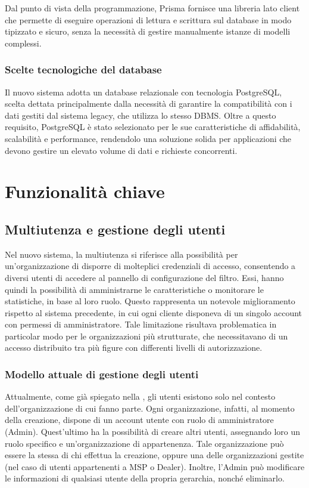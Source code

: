 Dal punto di vista della programmazione, Prisma fornisce una libreria lato client che permette di eseguire operazioni di lettura e scrittura sul database in modo tipizzato e sicuro, senza la necessità di gestire manualmente istanze di modelli complessi.

\subsubsection{Scelte tecnologiche del database}
Il nuovo sistema adotta un database relazionale con tecnologia PostgreSQL, scelta dettata principalmente dalla necessità di garantire la compatibilità con i dati gestiti dal sistema legacy, che utilizza lo stesso DBMS. Oltre a questo requisito, PostgreSQL è stato selezionato per le sue caratteristiche di affidabilità, scalabilità e performance, rendendolo una soluzione solida per applicazioni che devono gestire un elevato volume di dati e richieste concorrenti.

\section{Funzionalità chiave}
\subsection{Multiutenza e gestione degli utenti}
Nel nuovo sistema, la multiutenza si riferisce alla possibilità per un'organizzazione di disporre di molteplici credenziali di accesso, consentendo a diversi utenti di accedere al pannello di configurazione del filtro. Essi, hanno quindi la possibilità di amministrarne le caratteristiche o monitorare le statistiche, in base al loro ruolo. Questo rappresenta un notevole miglioramento rispetto al sistema precedente, in cui ogni cliente disponeva di un singolo account con permessi di amministratore. Tale limitazione risultava problematica in particolar modo per le organizzazioni più strutturate, che necessitavano di un accesso distribuito tra più figure con differenti livelli di autorizzazione.

\subsubsection{Modello attuale di gestione degli utenti}
Attualmente, come già spiegato nella , gli utenti esistono solo nel contesto dell'organizzazione di cui fanno parte. Ogni organizzazione, infatti, al momento della creazione, dispone di un account utente con ruolo di amministratore (Admin). Quest'ultimo ha la possibilità di creare altri utenti, assegnando loro un ruolo specifico e un'organizzazione di appartenenza. Tale organizzazione può essere la stessa di chi effettua la creazione, oppure una delle organizzazioni gestite (nel caso di utenti appartenenti a MSP o Dealer). Inoltre, l'Admin può modificare le informazioni di qualsiasi utente della propria gerarchia, nonché eliminarlo.

